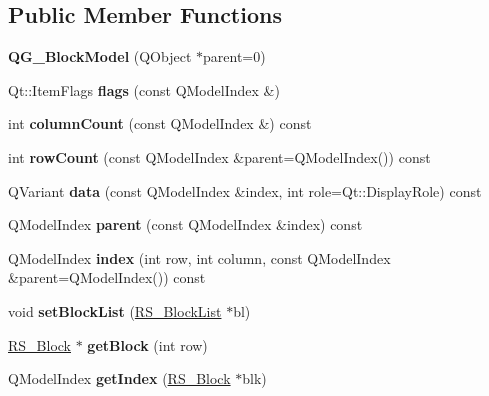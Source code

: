 \subsection*{Public Member Functions}
\begin{DoxyCompactItemize}
\item 
\hypertarget{classQG__BlockModel_ad03913da840c4cc02c56dc6768ebd8f8}{{\bfseries Q\-G\-\_\-\-Block\-Model} (Q\-Object $\ast$parent=0)}\label{classQG__BlockModel_ad03913da840c4cc02c56dc6768ebd8f8}

\item 
\hypertarget{classQG__BlockModel_ad3d5356314ba319fec6feff3061bff34}{Qt\-::\-Item\-Flags {\bfseries flags} (const Q\-Model\-Index \&)}\label{classQG__BlockModel_ad3d5356314ba319fec6feff3061bff34}

\item 
\hypertarget{classQG__BlockModel_a8766a7d6ee7a9a332a276fc8ab2cbb28}{int {\bfseries column\-Count} (const Q\-Model\-Index \&) const }\label{classQG__BlockModel_a8766a7d6ee7a9a332a276fc8ab2cbb28}

\item 
\hypertarget{classQG__BlockModel_a0c6f29f34f6a9cde595403b897c0df7d}{int {\bfseries row\-Count} (const Q\-Model\-Index \&parent=Q\-Model\-Index()) const }\label{classQG__BlockModel_a0c6f29f34f6a9cde595403b897c0df7d}

\item 
\hypertarget{classQG__BlockModel_ac2d2f46cfffbbb95e88539037527322a}{Q\-Variant {\bfseries data} (const Q\-Model\-Index \&index, int role=Qt\-::\-Display\-Role) const }\label{classQG__BlockModel_ac2d2f46cfffbbb95e88539037527322a}

\item 
\hypertarget{classQG__BlockModel_a69801c7cc8f746755c2ddb85be64be45}{Q\-Model\-Index {\bfseries parent} (const Q\-Model\-Index \&index) const }\label{classQG__BlockModel_a69801c7cc8f746755c2ddb85be64be45}

\item 
\hypertarget{classQG__BlockModel_a5fee701b7b1875e10b5711fcabb59da4}{Q\-Model\-Index {\bfseries index} (int row, int column, const Q\-Model\-Index \&parent=Q\-Model\-Index()) const }\label{classQG__BlockModel_a5fee701b7b1875e10b5711fcabb59da4}

\item 
\hypertarget{classQG__BlockModel_af604ef6f3081e54a3eb1f0b620c35156}{void {\bfseries set\-Block\-List} (\hyperlink{classRS__BlockList}{R\-S\-\_\-\-Block\-List} $\ast$bl)}\label{classQG__BlockModel_af604ef6f3081e54a3eb1f0b620c35156}

\item 
\hypertarget{classQG__BlockModel_a6bc847a3891ff49323824d823f2617b0}{\hyperlink{classRS__Block}{R\-S\-\_\-\-Block} $\ast$ {\bfseries get\-Block} (int row)}\label{classQG__BlockModel_a6bc847a3891ff49323824d823f2617b0}

\item 
\hypertarget{classQG__BlockModel_a81ccc00da9e293e3de35a48e47ac2973}{Q\-Model\-Index {\bfseries get\-Index} (\hyperlink{classRS__Block}{R\-S\-\_\-\-Block} $\ast$blk)}\label{classQG__BlockModel_a81ccc00da9e293e3de35a48e47ac2973}

\end{DoxyCompactItemize}


